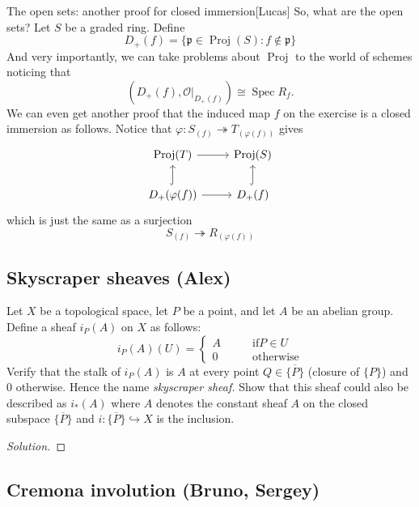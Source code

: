 \begin{thing4}{The open sets: another proof for closed immersion}[Lucas]\leavevmode
	So, what are the open sets? Let $S$ be a graded ring. Define
	\[D_{+}(f)=\{\mathfrak{p}\in\operatorname{Proj}(S):f\not \in \mathfrak{p}\}\]
	And very importantly, we can take problems about $\operatorname{Proj}$ to the world of schemes noticing that
	\[(D_+(f),\mathcal{O}|_{D_+(f)})\cong \operatorname{Spec}R_{f}.\]
We can even get another proof that the induced map $f$ on the exercise is a closed immersion as follows. Notice that $\varphi:S_{(f)}\twoheadrightarrow T_{(\varphi(f))}$ gives
\[\begin{tikzcd}
	\operatorname{Proj}(T)\arrow[r]&\operatorname{Proj}(S)\\
	D_+(\varphi(f))\arrow[u,hook]\arrow[r]& D_+(f)\arrow[u,hook]
\end{tikzcd}\]
which is just the same as a surjection
\[S_{(f)}\twoheadrightarrow R_{(\varphi(f))}\]
\end{thing4}

\subsection{Skyscraper sheaves (Alex)}

\begin{manualexercise}{1.17}
	Let $X$ be a topological space, let $P$ be a point, and let $A$ be an abelian group. Define a sheaf $i_P(A)$ on $X$ as follows:
	\[i_P(A)(U)=\begin{cases}
		A\qquad &\text{if} P\in U \\
		0\qquad &\text{otherwise} 
	\end{cases}\]
	Verify that the stalk of $i_P(A)$ is $A$ at every point $Q\in\overline{\{P\}}$ (closure of $\{P\}$) and 0 otherwise. {\color{5}Hence the name \textit{skyscraper sheaf.}} Show that this sheaf could also be described as $i_*(A)$ where $A$ denotes the constant sheaf $A$ on the closed subspace $\overline{\{P\}}$ and $i:\overline{\{P\}}\hookrightarrow  X$ is the inclusion.
\end{manualexercise}

\begin{proof}[Solution]
\end{proof}

\subsection{Cremona involution (Bruno, Sergey)}

